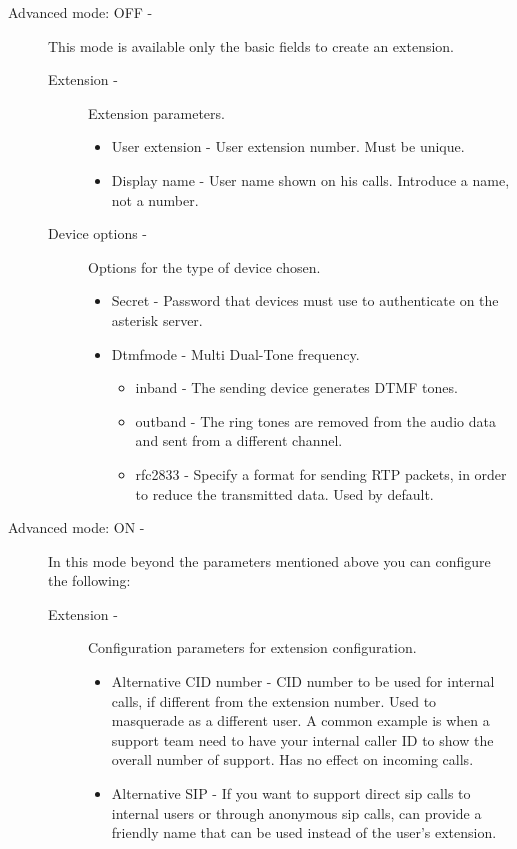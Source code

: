 \begin{description}
	\item[Advanced mode: OFF -] This mode is available only the basic fields to create an extension.
        \begin{description}
            \item[Extension -] Extension parameters.
                \begin{itemize}
                    \item User extension - User extension number. Must be unique.
                    \item Display name - User name shown on his calls. Introduce a name, not a number.
                \end{itemize}

            \item[Device options -] Options for the type of device chosen.
                \begin{itemize}
                    \item Secret - Password that devices must use to authenticate on the asterisk server.
                    \item Dtmfmode - Multi Dual-Tone frequency.
                        \begin{itemize}
                            \item inband - The sending device generates DTMF tones.
                            \item outband - The ring tones are removed from the audio data and sent from a different channel.
                            \item rfc2833 - Specify a format for sending RTP packets, in order to reduce the transmitted data. Used by default.
                        \end{itemize}
                \end{itemize}
        \end{description}
	\item[Advanced mode: ON -] In this mode beyond the parameters mentioned above you can configure the following:
        \begin{description}
            \item[Extension -] Configuration parameters for extension configuration.
                \begin{itemize}
                    \item Alternative CID number - CID number to be used for internal calls, if different from the extension number. Used to masquerade as a different user. A common example is when a support team need to have your internal caller ID to show the overall number of support. Has no effect on incoming calls.
                    \item Alternative SIP - If you want to support direct sip calls to internal users or through anonymous sip calls, can provide a friendly name that can be used instead of the user's extension.
                \end{itemize}


\end{description}
\end{description}
